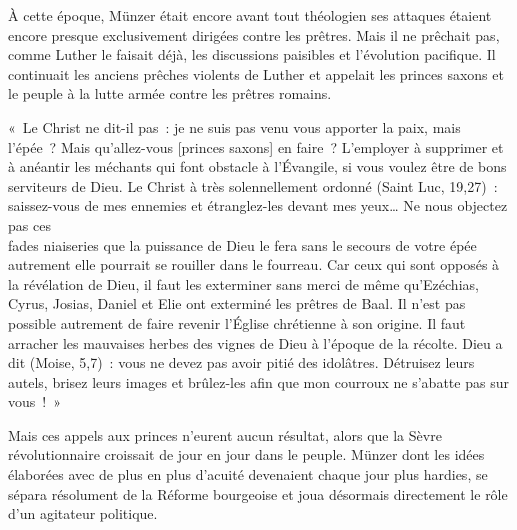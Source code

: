 \documentclass[french,twoside]{book} %
\begin{document}
À cette époque, Münzer était encore avant tout théologien ses attaques étaient encore presque exclusivement dirigées contre les prêtres. Mais il ne prêchait pas, comme Luther le faisait déjà, les discussions paisibles et l’évolution pacifique. Il continuait les anciens prêches violents de Luther et appelait les princes saxons et le peuple à la lutte armée contre les prêtres romains.\par
« Le Christ ne dit-il pas : je ne suis pas venu vous apporter la paix, mais l’épée ? Mais qu’allez-vous [princes saxons] en faire ? L’employer à supprimer et à anéantir les méchants qui font obstacle à l’Évangile, si vous voulez être de bons serviteurs de Dieu. Le Christ à très solennellement ordonné (Saint Luc, 19,27) : saissez-vous de mes ennemies et étranglez-les devant mes yeux… Ne nous objectez pas ces \\
fades niaiseries que la puissance de Dieu le fera sans le secours de votre épée autrement elle pourrait se rouiller dans le fourreau. Car ceux qui sont opposés à la révélation de Dieu, il faut les exterminer sans merci de même qu’Ezéchias, Cyrus, Josias, Daniel et Elie ont exterminé les prêtres de Baal. Il n’est pas possible autrement de faire revenir l’Église chrétienne à son origine. Il faut arracher les mauvaises herbes des vignes de Dieu à l’époque de la récolte. Dieu a dit (Moise, 5,7) : vous ne devez pas avoir pitié des idolâtres. Détruisez leurs autels, brisez leurs images et brûlez-les afin que mon courroux ne s’abatte pas sur vous ! »\par
Mais ces appels aux princes n’eurent aucun résultat, alors que la Sèvre révolutionnaire croissait de jour en jour dans le peuple. Münzer dont les idées élaborées avec de plus en plus d’acuité devenaient chaque jour plus hardies, se sépara résolument de la Réforme bourgeoise et joua désormais directement le rôle d’un agitateur politique.\par
\end{document}
